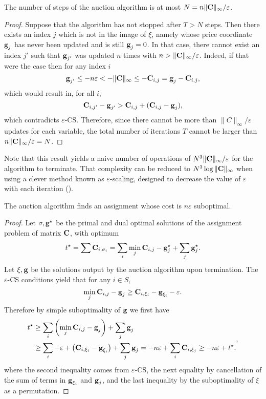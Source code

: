\begin{prop} The number of steps of the auction algorithm is at most $N=n\|\mathrm{\textbf{C}}\|_\infty/\varepsilon$.
\end{prop}
\begin{proof}Suppose that the algorithm has not stopped after $T>N$ steps. Then there exists an index $j$ which is not in the image of $\xi$, namely whose price coordinate $\mathrm{\textbf{g}}_j$ has never been updated and is still $\mathrm{\textbf{g}}_j=0$. In that case, there cannot exist an index $j'$ such that $\mathrm{\textbf{g}}_{j'}$ was updated $n$ times with $n>\|\mathrm{\textbf{C}}\|_\infty/\varepsilon$. Indeed, if that were the case then for any index $i$
$$\mathrm{\textbf{g}}_{j'}\leq-n\varepsilon<-\|\mathrm{\textbf{C}}\|_\infty\leq -\mathrm{\textbf{C}}_{i,j} = \mathrm{\textbf{g}}_j-\mathrm{\textbf{C}}_{i,j},$$
which would result in, for all $i$,
$$\mathrm{\textbf{C}}_{i,j'}-\mathrm{\textbf{g}}_{j'}> \mathrm{\textbf{C}}_{i,j}+ (\mathrm{\textbf{C}}_{i,j}-\mathrm{\textbf{g}}_j),$$
which contradicts $\varepsilon$-CS. Therefore, since there cannot be more than $\|C\|_\infty/\varepsilon$ updates for each variable, the total number of iterations $T$ cannot be larger than $n\|\mathrm{\textbf{C}}\|_\infty/\varepsilon=N$.
\end{proof}

\begin{rem} Note that this result yields a naive number of operations of $N^3\|\mathrm{\textbf{C}}\|_\infty/\varepsilon$ for the algorithm to terminate. That complexity can be reduced to $N^3 \log\|\mathrm{\textbf{C}}\|_\infty$ when using a clever method known as $\varepsilon$-scaling, designed to decrease the value of $\varepsilon$ with each iteration (\cite[p. 264]{bertsekas1998network}).
\end{rem}

\begin{prop} The auction algorithm finds an assignment whose cost is $n\varepsilon$ suboptimal.
\end{prop}
\begin{proof}
	Let $\sigma,\mathrm{\textbf{g}}^\star$ be the primal and dual optimal solutions of the assignment problem of matrix $\mathrm{\textbf{C}}$, with optimum $$t^\star=\sum \mathrm{\textbf{C}}_{i,\sigma_i} = \sum_i \min_{j}\mathrm{\textbf{C}}_{i,j}-\mathrm{\textbf{g}}^\star_j+\sum_j\mathrm{\textbf{g}}^\star_j.$$ 
Let $\xi,\mathrm{\textbf{g}}$ be the solutions output by the auction algorithm upon termination. The $\varepsilon$-CS conditions yield that for any $i\in S$, 
$$\min_{j} \mathrm{\textbf{C}}_{i,j} - \mathrm{\textbf{g}}_{j}\geq \mathrm{\textbf{C}}_{i,\xi_i} - \mathrm{\textbf{g}}_{\xi_i} -\varepsilon.$$
Therefore by simple suboptimality of $\mathrm{\textbf{g}}$ we first have
	$$\begin{aligned}t^\star&\geq \sum_i \left(\min_{j} \mathrm{\textbf{C}}_{i,j}-\mathrm{\textbf{g}}_{j}\right) + \sum_j \mathrm{\textbf{g}}_j\\
&\geq 
	\sum_i -\varepsilon+\left(\mathrm{\textbf{C}}_{i,\xi_i}-\mathrm{\textbf{g}}_{\xi_i}\right) + \sum_j \mathrm{\textbf{g}}_j = -n\varepsilon + \sum_i \mathrm{\textbf{C}}_{i,\xi_j} \geq  - n\varepsilon + t^\star.\end{aligned},$$
where the second inequality comes from $\varepsilon$-CS, the next equality by cancellation of the sum of terms in $\mathrm{\textbf{g}}_{\xi_i}$ and $\mathrm{\textbf{g}}_{j}$, and the last inequality by the suboptimality of $\xi$ as a permutation.	
\end{proof}


